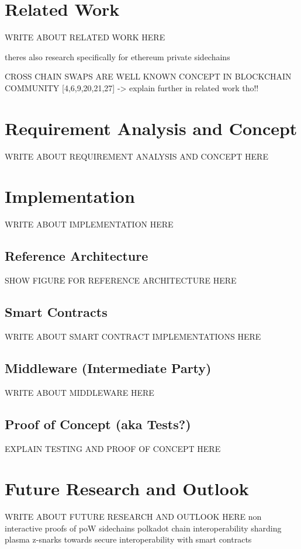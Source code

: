 \chapter{Related Work}
\label{ch:chapter03}
WRITE ABOUT RELATED WORK HERE

theres also research specifically for ethereum private sidechains \cite{robinson2019atomic}

CROSS CHAIN SWAPS ARE WELL KNOWN CONCEPT IN BLOCKCHAIN COMMUNITY [4,6,9,20,21,27] -> explain further in related work tho!!


\chapter{Requirement Analysis and Concept}
\label{ch:chapter04}
WRITE ABOUT REQUIREMENT ANALYSIS AND CONCEPT HERE

\chapter{Implementation}
\label{ch:chapter05}
WRITE ABOUT IMPLEMENTATION HERE

\section{Reference Architecture}
\label{sec:chapter05:ref_architecture}

SHOW FIGURE FOR REFERENCE ARCHITECTURE HERE
%
%
\section{Smart Contracts}
\label{sec:chapter05:smartcontracts}
WRITE ABOUT SMART CONTRACT IMPLEMENTATIONS HERE

\section{Middleware (Intermediate Party)}
\label{sec:chapter05:middleware}
WRITE ABOUT MIDDLEWARE HERE

\section{Proof of Concept (aka Tests?)}
\label{sec:chapter05:poc}
EXPLAIN TESTING AND PROOF OF CONCEPT HERE

\chapter{Future Research and Outlook}
\label{ch:chapter06}
WRITE ABOUT FUTURE RESEARCH AND OUTLOOK HERE
non interactive proofs of poW \cite{kiayias2017non} sidechains \cite{kiayias2019proof} polkadot \cite{wood2016polkadot}  chain interoperability \cite{buterin2016chain} sharding \cite{buterin2017sharding} plasma \cite{poon2017plasma} z-snarks \cite{garoffolo2020zendoo} towards secure interoperability with smart contracts \cite{dagher2017towards}


